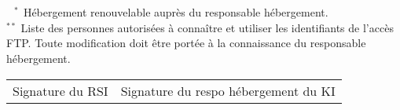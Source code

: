 \documentclass{ki019}
\begin{document}
\pagestyle{empty}

\noindent

\section{}

\begin{center}


\end{center}

\vspace{-0.5cm}
\noindent
$^{\phantom{*}*}$ Hébergement renouvelable auprès du responsable hébergement. \\
$^{**}$ Liste des personnes autorisées à connaître et utiliser les identifiants de l'accès FTP. Toute modification doit être portée à la connaissance du responsable hébergement.

\vspace{0.5cm}
\Large
\begin{tabular}{p{7cm}p{8cm}}
Signature du RSI & Signature du respo hébergement du KI
\end{tabular}

\Footer{\today}
\end{document}

